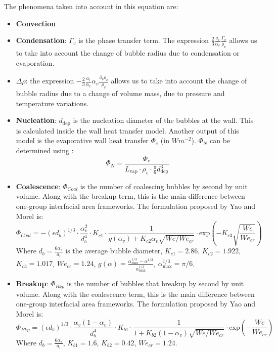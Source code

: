 The phenomena taken into account in this equation are:
\begin{itemize}
	\item \textbf{Convection}
	\item \textbf{Condensation}: $\Gamma_v$ is the phase transfer term. The expression $\frac{2}{3} \frac{a_i}{\alpha_v} \frac{\Gamma_v}{\rho_v} $ allows us to take into account the change of bubble radius due to condensation or evaporation.
	\item \textbf{$\Delta \rho$}: the expression $- \frac{2}{3} \frac{a_i}{\alpha_v} \alpha_v\frac{\partial_t \rho_v}{\rho_v} $ allows us to take into account the change of bubble radius due to a change of volume mass, due to pressure and temperature variations.
	\item \textbf{Nucleation}: $d_\text{dep}$ is the nucleation diameter of the bubbles at the wall. This is calculated inside the wall heat transfer model. Another output of this model is the evaporative wall heat transfer $\Phi_{e}$ (in $Wm^{-2}$). $\Phi_N$ can be determined using :
	\begin{equation}
		\Phi_{N} 
		=
		\frac{\Phi_{e}}{L_\text{vap} \cdot \rho_v \cdot\frac{\pi}{6}d_\text{dep}^3}
	\end{equation}
	\item \textbf{Coalescence}: $\Phi_{Coal}$ is the number of coalescing bubbles by second by unit volume. Along with the breakup term, this is the main difference between one-group interfacial area frameworks. The formulation proposed by Yao and Morel is:
	\begin{equation}
		\Phi_{Coal} = - (\epsilon d_b)^{1/3} \cdot \frac{\alpha_v^2}{d_b^4} \cdot K_{c1} \cdot \frac{1}{g(\alpha_v) + K_{c2}\alpha_v \sqrt{We/We_{cr}}} \cdot \text{exp}\left(-K_{c3} \sqrt{\frac{We}{We_{cr}}}\right)
	\end{equation}
	Where $d_b = \frac{6 \alpha_v}{a_i} $ is the average bubble diameter, $K_{c1} = 2.86$, $K_{c2} = 1.922$, $K_{c3} = 1.017$, $We_{cr} = 1.24$, $g(\alpha) = \frac{\alpha_\text{max}^{1/3}-\alpha^{1/3}}{\alpha_\text{max}^{1/3}}$, $\alpha_\text{max}^{1/3} = \pi/6$.
	\item \textbf{Breakup}: $\Phi_{Bkp}$ is the number of bubbles that breakup by second by unit volume. Along with the coalescence term, this is the main difference between one-group interfacial area frameworks. The formulation proposed by Yao and Morel is:
	\begin{equation}
	\Phi_{Bkp} = (\epsilon d_b)^{1/3} \cdot \frac{\alpha_v(1-\alpha_v)}{d_b^4} \cdot K_{b1} \cdot \frac{1}{1 + K_{b2}(1-\alpha_v) \sqrt{We/We_{cr}}} \cdot \text{exp}\left(- \frac{We}{We_{cr}}\right)
	\end{equation}
	Where $d_b = \frac{6 \alpha_v}{a_i} $, $K_{b1} = 1.6$, $K_{b2} = 0.42$, $We_{cr} = 1.24$.
	
\end{itemize}

